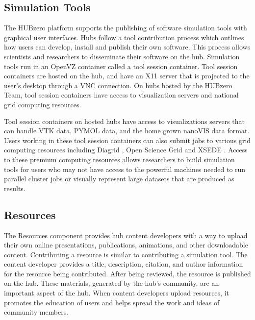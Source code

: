 \subsection{Simulation Tools}
\label{ssec:hub_components_simulation_tools}

The HUBzero platform supports the publishing of software simulation tools with
graphical user interfaces.  Hubs follow a tool contribution process which
outlines how users can develop, install and publish their own software. This
process allows scientists and researchers to disseminate their software on the
hub.  Simulation tools run in an OpenVZ \cite{OpenVZ:2013:Online} container
called a tool session container.  Tool session containers are hosted on the
hub, and have an X11 server that is projected to the user's desktop through a
VNC \cite{VNC:2013:Online} connection. On hubs hosted by the HUBzero Team, tool
session containers have access to visualization servers and national grid
computing resources.




Tool session containers on hosted hubs have access to visualizations servers
that can handle VTK data, PYMOL data, and the home grown nanoVIS data format.
Users working in these tool session containers can also submit jobs to various
grid computing resources including Diagrid \cite{Diagrid2008}, Open Science
Grid \cite{Pordes2008} and XSEDE \cite{XSEDE2008}.  Access to these premium
computing resources allows researchers to build simulation tools for users who
may not have access to the powerful machines needed to run parallel cluster
jobs or visually represent large datasets that are produced as results.


\subsection{Resources}
\label{ssec:hub_components_resources}

The Resources component provides hub content developers with a way to upload
their own online presentations, publications, animations, and other
downloadable content.  Contributing a resource is similar to contributing a
simulation tool. The content developer provides a title, description, citation,
and author information for the resource being contributed. After being
reviewed, the resource is published on the hub. These materials, generated by
the hub's community, are an important aspect of the hub. When content
developers upload resources, it promotes the education of users and helps
spread the work and ideas of community members.


